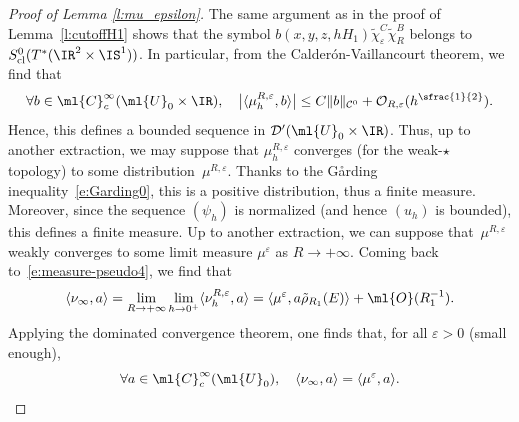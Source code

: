\documentclass[10pt]{amsart}
\theoremstyle{plain}
\theoremstyle{definition}
\theoremstyle{remark}
\begin{document}
\begin{proof}[Proof of Lemma \ref{l:mu_epsilon}]
The same argument as in the proof of Lemma~\ref{l:cutoffH1} shows that the symbol $b(x,y,z,hH_1)\tilde{\chi}_\varepsilon^C\tilde{\chi}_R^B$ belongs to $S^0_{\textup{cl}}(T^*(\IR^2\times\IS^1))$. In particular, from the Calderón-Vaillancourt theorem, we find that
\[
\forall b\in\ml{C}_c^{\infty}(\ml{U}_0\times\IR),\quad \bigl|\langle\mu_h^{R,\varepsilon},b\rangle\bigr|\leq C \|b\|_{\mathcal{C}^0}+\mathcal{O}_{R,\varepsilon}(h^{\sfrac{1}{2}}).
\]
Hence, this defines a bounded sequence in $\mathcal{D}^\prime(\ml{U}_0\times\IR)$. Thus, up to another extraction, we may suppose that $\mu_{h}^{R,\varepsilon}$ converges (for the weak-$\star$ topology) to some distribution~$\mu^{R,\varepsilon}$. Thanks to the G\aa rding inequality~\eqref{e:Garding0}, this is a positive distribution, thus a finite measure. Moreover, since the sequence $(\psi_h)$ is normalized (and hence $(u_h)$ is bounded), this defines a finite measure. Up to another extraction, we can suppose that~$\mu^{R,\varepsilon}$ weakly converges to some limit measure $\mu^{\varepsilon}$ as $R\to +\infty$. Coming back to~\eqref{e:measure-pseudo4}, we find that
\begin{equation}\label{e:comparison-measure0}\langle\nu_\infty,a\rangle=\lim_{R\to+\infty}\lim_{h\to 0^+}\langle\nu_h^{R,\varepsilon},a\rangle=\langle \mu^{\varepsilon}, a\tilde{\rho}_{R_1} (E)\rangle+\ml{O}(R_1^{-1}).
\end{equation}
Applying the dominated convergence theorem, one finds that, for all $\varepsilon>0$ (small enough),
\[
\forall a\in\ml{C}^{\infty}_c(\ml{U}_0),\quad\langle\nu_\infty,a\rangle=\langle\mu^{\varepsilon},a\rangle.\qedhere
\]
\end{proof}
\end{document}
